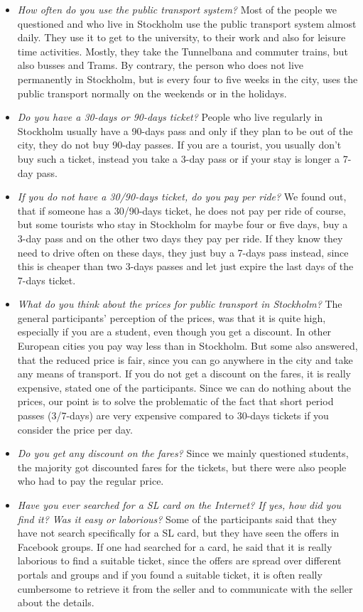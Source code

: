 \documentclass[11pt,twoside,a4paper]{report}
\begin{document}
\begin{itemize}
	\item \textit{How often do you use the public transport system?} Most of the people we questioned and who live in Stockholm use the public transport system almost daily. They use it to get to the university, to their work and also for leisure time activities. Mostly, they take the Tunnelbana and commuter trains, but also busses and Trams. By contrary, the person who does not live permanently in Stockholm, but is every four to five weeks in the city, uses the public transport normally on the weekends or in the holidays.
	\item \textit{Do you have a 30-days or 90-days ticket?} People who live regularly in Stockholm usually have a 90-days pass and only if they plan to be out of the city, they do not buy 90-day passes. If you are a tourist, you usually don’t buy such a ticket, instead you take a 3-day pass or if your stay is longer a 7-day pass.
	\item \textit{If you do not have a 30/90-days ticket, do you pay per ride?} We found out, that if someone has a 30/90-days ticket, he does not pay per ride of course, but some tourists who stay in Stockholm for maybe four or five days, buy a 3-day pass and on the other two days they pay per ride. If they know they need to drive often on these days, they just buy a 7-days pass instead, since this is cheaper than two 3-days passes and let just expire the last days of the 7-days ticket.
	\item \textit{What do you think about the prices for public transport in Stockholm?} The general participants’ perception of the prices, was that it is quite high, especially if you are a student, even though you get a discount. In other European cities you pay way less than in Stockholm. But some also answered, that the reduced price is fair, since you can go anywhere in the city and take any means of transport. If you do not get a discount on the fares, it is really expensive, stated one of the participants. 
Since we can do nothing about the prices, our point is to solve the problematic of the fact that short period passes (3/7-days) are very expensive compared to 30-days tickets if you consider the price per day. 
	\item \textit{Do you get any discount on the fares?} Since we mainly questioned students, the majority got discounted fares for the tickets, but there were also people who had to pay the regular price.
	\item \textit{Have you ever searched for a SL card on the Internet? If yes, how did you find it? Was it easy or laborious?} Some of the participants said that they have not search specifically for a SL card, but they have seen the offers in Facebook groups. If one had searched for a card, he said that it is really laborious to find a suitable ticket, since the offers are spread over different portals and groups and if you found a suitable ticket, it is often really cumbersome to retrieve it from the seller and to communicate with the seller about the details.

\end{itemize}
\end{document}
